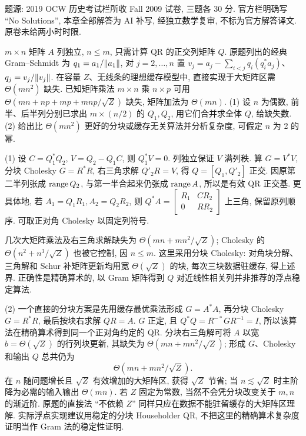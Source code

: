 题源: 2019 OCW 历史考试栏所收 Fall 2009 试卷, 三题各 30 分. 官方栏明确写 ``No Solutions'', 本章全部解答为 AI 补写, 经独立数学复审, 不标为官方解答译文. 原卷未给两小时时限.
\begin{exercise}\label{e2009:q1}
$m\times n$ 矩阵 $A$ 列独立, $n\le m$, 只需计算 QR 的正交列矩阵 $Q$. 原题列出的经典 Gram--Schmidt 为 $q_1=a_1/\lVert a_1\rVert$, 对 $j=2,\ldots,n$ 置 $v_j=a_j-\sum_{i<j}q_i(q_i^*a_j)$、$q_j=v_j/\lVert v_j\rVert$. 在容量 $Z$、无线条的理想缓存模型中, 直接实现于大矩阵区需 $\Theta(mn^2)$ 缺失. 已知矩阵乘法 $m\times n$ 乘 $n\times p$ 可用 $\Theta(mn+np+mp+mnp/\sqrt Z)$ 缺失, 矩阵加法为 $\Theta(mn)$.
(1) 设 $n$ 为偶数, 前半、后半列分别已求出 $m\times(n/2)$ 的 $Q_1,Q_2$, 用它们合并求全体 $Q$, 给缺失数.
(2) 给出比 $\Theta(mn^2)$ 更好的分块或缓存无关算法并分析复杂度, 可假定 $n$ 为 2 的幂.
\end{exercise}
\begin{solution}
(1) 设 $C=Q_1^*Q_2$, $V=Q_2-Q_1C$, 则 $Q_1^*V=0$. 列独立保证 $V$ 满列秩. 算 $G=V^*V$, 分块 Cholesky $G=R^*R$, 右三角求解 $Q'_2R=V$, 得 $Q=[Q_1,Q'_2]$ 正交. 因原第二半列张成 $\operatorname{range} Q_2$, 与第一半合起来仍张成 $\operatorname{range} A$, 所以是有效 QR 正交基. 更具体地, 若 $A_1=Q_1R_1,A_2=Q_2R_2$, 则 $Q^*A=\begin{bmatrix}R_1&CR_2\\0&RR_2\end{bmatrix}$ 上三角, 保留原列顺序. 可取正对角 Cholesky 以固定列符号.

几次大矩阵乘法及右三角求解缺失为 $\Theta(mn+mn^2/\sqrt Z)$; Cholesky 的 $\Theta(n^2+n^3/\sqrt Z)$ 也被它控制, 因 $n\le m$. 这里采用分块 Cholesky: 对角块分解、三角解和 Schur 补矩阵更新均用宽 $\Theta(\sqrt Z)$ 的块, 每次三块数据驻缓存, 得上述界. 正确性是精确算术的, 以 Gram 矩阵得到 $Q$ 对近线性相关列并非推荐的浮点稳定算法.

(2) 一个直接的分块方案是先用缓存最优乘法形成 $G=A^*A$, 再分块 Cholesky $G=R^*R$, 最后按块右求解 $QR=A$. $G$ 正定, 且 $Q^*Q=R^{-*}GR^{-1}=I$, 所以该算法在精确算术得到同一个正对角约定的 QR. 分块右三角解可将 $A$ 以宽 $b=\Theta(\sqrt Z)$ 的行列块更新, 其缺失为 $\Theta(mn+mn^2/\sqrt Z)$; 形成 $G$、Cholesky 和输出 $Q$ 总共仍为
\[
 \Theta(mn+mn^2/\sqrt Z).
\]
在 $n$ 随问题增长且 $\sqrt Z$ 有效增加的大矩阵区, 获得 $\sqrt Z$ 节省; 当 $n\lesssim\sqrt Z$ 时主阶降为必需的输入输出 $\Theta(mn)$. 若 $Z$ 固定为常数, 当然不会凭分块改变关于 $m,n$ 的渐近阶. 原题的直接法 ``不依赖 $Z$'' 同样只应在数据不能驻留缓存的大矩阵区理解. 实际浮点实现建议用稳定的分块 Householder QR, 不把这里的精确算术复杂度证明当作 Gram 法的稳定性证明.
\end{solution}
